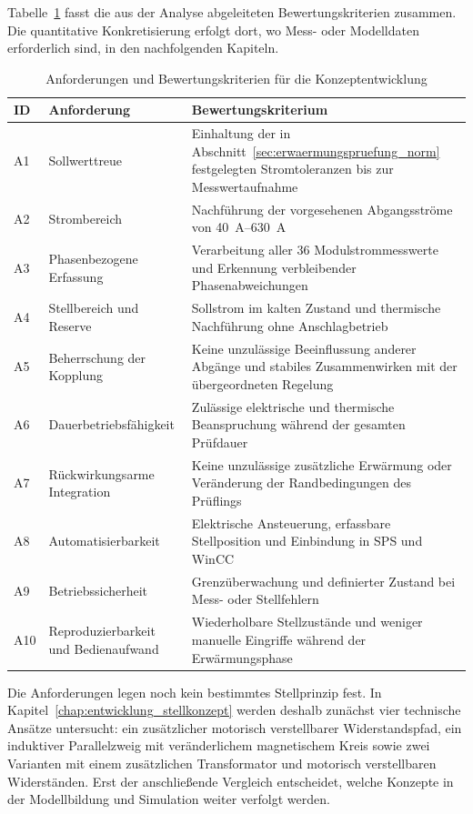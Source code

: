 Tabelle~\ref{tab:anforderungen_optimierung} fasst die aus der Analyse
abgeleiteten Bewertungskriterien zusammen. Die quantitative Konkretisierung
erfolgt dort, wo Mess- oder Modelldaten erforderlich sind, in den
nachfolgenden Kapiteln.

\begin{table}[H]
    \centering
    \caption{Anforderungen und Bewertungskriterien für die
    Konzeptentwicklung}
    \label{tab:anforderungen_optimierung}
    \small
    \begin{tabular}{p{}p{}p{}}
        \toprule
        ID & Anforderung & Bewertungskriterium \\
        \midrule
        A1 & Sollwerttreue &
        Einhaltung der in Abschnitt~\ref{sec:erwaermungspruefung_norm}
        festgelegten Stromtoleranzen bis zur Messwertaufnahme \\
        A2 & Strombereich &
        Nachführung der vorgesehenen Abgangsströme von
        \SIrange{40}{630}{\ampere} \\
        A3 & Phasenbezogene Erfassung &
        Verarbeitung aller 36 Modulstrommesswerte und Erkennung
        verbleibender Phasenabweichungen \\
        A4 & Stellbereich und Reserve &
        Sollstrom im kalten Zustand und thermische Nachführung ohne
        Anschlagbetrieb \\
        A5 & Beherrschung der Kopplung &
        Keine unzulässige Beeinflussung anderer Abgänge und stabiles
        Zusammenwirken mit der übergeordneten Regelung \\
        A6 & Dauerbetriebsfähigkeit &
        Zulässige elektrische und thermische Beanspruchung während der
        gesamten Prüfdauer \\
        A7 & Rückwirkungsarme Integration &
        Keine unzulässige zusätzliche Erwärmung oder Veränderung der
        Randbedingungen des Prüflings \\
        A8 & Automatisierbarkeit &
        Elektrische Ansteuerung, erfassbare Stellposition und Einbindung in
        SPS und WinCC \\
        A9 & Betriebssicherheit &
        Grenzüberwachung und definierter Zustand bei Mess- oder
        Stellfehlern \\
        A10 & Reproduzierbarkeit und Bedienaufwand &
        Wiederholbare Stellzustände und weniger manuelle Eingriffe während
        der Erwärmungsphase \\
        \bottomrule
    \end{tabular}
\end{table}

Die Anforderungen legen noch kein bestimmtes Stellprinzip fest. In
Kapitel~\ref{chap:entwicklung_stellkonzept} werden deshalb zunächst vier
technische Ansätze untersucht: ein zusätzlicher motorisch verstellbarer
Widerstandspfad, ein induktiver Parallelzweig mit veränderlichem
magnetischem Kreis sowie zwei Varianten mit einem zusätzlichen Transformator
und motorisch verstellbaren Widerständen. Erst der anschließende Vergleich
entscheidet, welche Konzepte in der Modellbildung und Simulation weiter
verfolgt werden.
